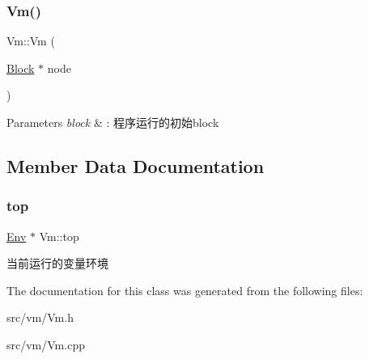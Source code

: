 \subsubsection{\texorpdfstring{Vm()}{Vm()}}
{\footnotesize\ttfamily Vm\+::\+Vm (\begin{DoxyParamCaption}\item[{\hyperlink{class_block}{Block} $\ast$}]{node }\end{DoxyParamCaption})}


\begin{DoxyParams}{Parameters}
{\em block} & \+: 程序运行的初始block \\
\hline
\end{DoxyParams}


\subsection{Member Data Documentation}
\mbox{\label{class_vm_a1a83823801a5ab090d9ad20527a6c638}} 
\subsubsection{\texorpdfstring{top}{top}}
{\footnotesize\ttfamily \hyperlink{class_env}{Env} $\ast$ Vm\+::top\hspace{0.3cm}{\ttfamily [static]}}

当前运行的变量环境 

The documentation for this class was generated from the following files\+:\begin{DoxyCompactItemize}
\item 
src/vm/Vm.\+h\item 
src/vm/Vm.\+cpp\end{DoxyCompactItemize}
